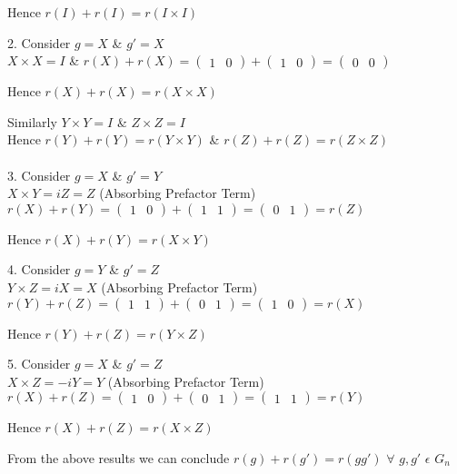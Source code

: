 \documentclass[a4paper,12pt]{article}
\begin{document}
\begin{enumerate}[label=(\alph*)]
\begin{center}
    Hence $r(I) + r(I) = r(I \times I)$
\end{center}
2. Consider $g=X$ \& $g'=X$ \\
$X \times X = I$ \& $r(X) + r(X) = \begin{pmatrix}
    1 & 0
\end{pmatrix} + \begin{pmatrix}
    1 & 0
\end{pmatrix} = \begin{pmatrix}
    0 & 0
\end{pmatrix}$
\begin{center}
    Hence $r(X)+r(X) = r(X \times X)$
\end{center}
Similarly $Y \times Y =I$ \& $Z \times Z =I$\\ 
Hence  $r(Y) +r(Y) = r(Y \times Y)$ \& $r(Z) +r(Z) = r(Z \times Z)$\\~\\
3. Consider $g=X$ \& $g'=Y$ \\
$X \times Y = iZ = Z$ (Absorbing Prefactor Term) \\
$r(X) +r(Y) = \begin{pmatrix}
1 & 0 
\end{pmatrix}+\begin{pmatrix}
    1 & 1
\end{pmatrix} = \begin{pmatrix}
    0 & 1
\end{pmatrix} = r(Z)$
\begin{center}
    Hence $r(X)+r(Y)=r(X\times Y)$
\end{center} 
4. Consider $g=Y$ \& $g'=Z$ \\
$Y \times Z = iX = X$ (Absorbing Prefactor Term) \\
$r(Y)+r(Z) = \begin{pmatrix}
    1 & 1
\end{pmatrix}+\begin{pmatrix}
    0 & 1
\end{pmatrix}=\begin{pmatrix}
    1 & 0
\end{pmatrix}=r(X)$ 
\begin{center}
    Hence $r(Y) +r(Z) = r(Y \times Z)$
\end{center}
5. Consider $g=X$ \& $g'=Z$ \\
$X \times Z = -iY =Y$ (Absorbing Prefactor Term) \\
$r(X)+r(Z) = \begin{pmatrix}
    1 & 0 
\end{pmatrix} + \begin{pmatrix}
    0 & 1
\end{pmatrix} = \begin{pmatrix}
    1 & 1
\end{pmatrix} = r(Y)$
\begin{center}
    Hence $r(X) + r(Z) = r(X \times Z)$
\end{center}
From the above results we can conclude $r(g) + r(g') = r(gg')$ $\forall$ $g,g'$ $\epsilon$ $G_{n}$ \\~\\


\end{enumerate}
\end{document}
